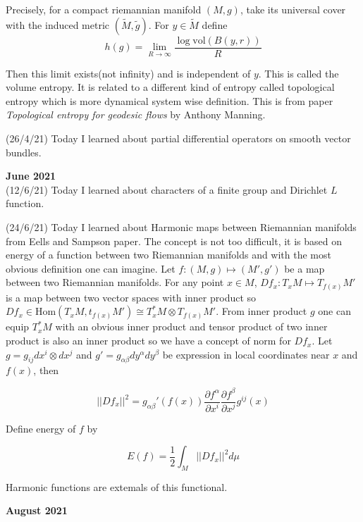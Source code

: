 \documentclass[12pt,a4paper]{article}
\newcommand{\half}{\ensuremath{\frac{1}{2}}}
\begin{document}
  Precisely, for a compact riemannian manifold $(M,g)$, take its universal cover with the induced metric $(\tilde{M},\tilde{g})$. For $y \in \tilde{M}$ define 
  \[ h(g) = \lim_{R \to \infty} \frac{\log \text{vol}(B(y,r))}{R} \]
  
  Then this limit exists(not infinity) and is independent of $y$. This is called the volume entropy. It is related to a different kind of entropy called topological entropy which is more dynamical system wise definition. This is from paper \textit{Topological entropy for geodesic flows} by Anthony Manning.
  
  (26/4/21) Today I learned about partial differential operators on smooth vector bundles.\\
  
  \maketitle\textbf{June 2021}
  \\
 
  (12/6/21) Today I learned about characters of a finite group and Dirichlet $L$ function.
  
  (24/6/21) Today I learned about Harmonic maps between Riemannian manifolds from Eells and Sampson paper. The concept is not too difficult, it is based on energy of a function between two Riemannian manifolds and with the most obvious definition one can imagine. Let $f :(M,g)\mapsto (M',g')$ be a map between two Riemannian manifolds. For any point $x \in M$, $Df_x :T_xM \mapsto T_{f(x)}M'$ is a map between two vector spaces with inner product so $Df_x \in \text{Hom}(T_xM,t_{f(x)}M')  \cong T^*_xM \otimes T_{f(x)}M'$. From inner product $g$ one can equip $T_x^*M$ with an obvious inner product and tensor product of two inner product is also an inner product so we have a concept of norm for $Df_x$. Let $g = g_{ij}dx^i\otimes dx^j$ and $g' = g_{\alpha \beta}dy^\alpha dy^\beta $ be expression in local coordinates near $x$ and $f(x)$, then 
  
  \[ ||Df_x||^2 = g_{\alpha \beta }'(f(x))\frac{\partial f^\alpha}{\partial x^i}\frac{\partial f^\beta}{\partial x^j}g^{ij}(x) \]
  
  Define energy of $f$ by 
  
  \[ E(f) = \half \int_M ||Df_x||^2d\mu \]
  
  Harmonic functions are extemals of this functional.\\
  
  \maketitle\textbf{August 2021}
  \\
  
\end{document}
